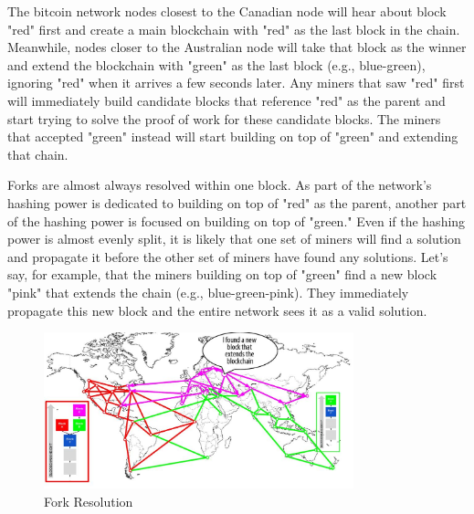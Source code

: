 \documentclass{article}
\begin{document}
    The bitcoin network nodes closest to the Canadian node will hear about block "red" first and create a main blockchain with "red" as the last block in the chain. Meanwhile, nodes closer to the Australian node will take that block as the winner and extend the blockchain with "green" as the last block (e.g., blue-green), ignoring "red" when it arrives a few seconds later. Any miners that saw "red" first will immediately build candidate blocks that reference "red" as the parent and start trying to solve the proof of work for these candidate blocks. The miners that accepted "green" instead will start building on top of "green" and extending that chain.

    Forks are almost always resolved within one block. As part of the network's hashing power is dedicated to building on top of "red" as the parent, another part of the hashing power is focused on building on top of "green." Even if the hashing power is almost evenly split, it is likely that one set of miners will find a solution and propagate it before the other set of miners have found any solutions. Let's say, for example, that the miners building on top of "green" find a new block "pink" that extends the chain (e.g., blue-green-pink). They immediately propagate this new block and the entire network sees it as a valid solution.

    \begin{figure}[H]
    \centering
    \includegraphics[width=0.8\textwidth]{img/msbt_0805.jpg}
    \caption{Fork Resolution}
    \end{figure}
\end{document}
